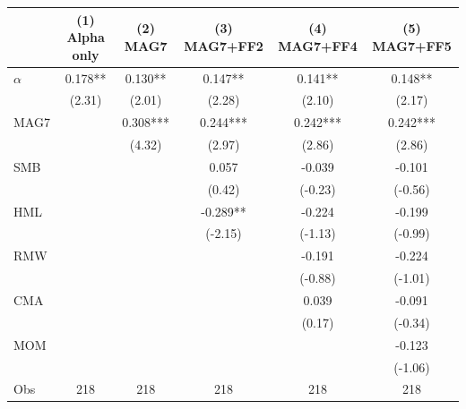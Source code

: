 \begin{tabular}{l*{5}{c}}
\toprule
 & (1) Alpha only & (2) MAG7 & (3) MAG7+FF2 & (4) MAG7+FF4 & (5) MAG7+FF5 \\
\midrule
$\alpha$ & 0.178** & 0.130** & 0.147** & 0.141** & 0.148** \\
 & (2.31) & (2.01) & (2.28) & (2.10) & (2.17) \\
MAG7 &  & 0.308*** & 0.244*** & 0.242*** & 0.242*** \\
 &  & (4.32) & (2.97) & (2.86) & (2.86) \\
SMB &  &  & 0.057 & -0.039 & -0.101 \\
 &  &  & (0.42) & (-0.23) & (-0.56) \\
HML &  &  & -0.289** & -0.224 & -0.199 \\
 &  &  & (-2.15) & (-1.13) & (-0.99) \\
RMW &  &  &  & -0.191 & -0.224 \\
 &  &  &  & (-0.88) & (-1.01) \\
CMA &  &  &  & 0.039 & -0.091 \\
 &  &  &  & (0.17) & (-0.34) \\
MOM &  &  &  &  & -0.123 \\
 &  &  &  &  & (-1.06) \\
Obs & 218 & 218 & 218 & 218 & 218 \\
\bottomrule
\end{tabular}